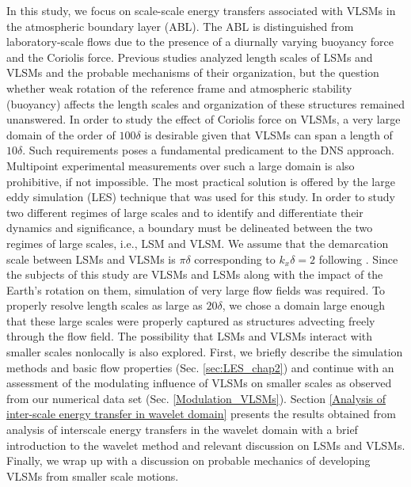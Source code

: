 In this study, we focus on scale-scale energy transfers associated with VLSMs in the atmospheric boundary layer (ABL). The ABL is distinguished from laboratory-scale flows due to the presence of a diurnally varying buoyancy  force and the Coriolis force. Previous studies analyzed length scales of LSMs and VLSMs and the probable mechanisms of their organization, but the question whether weak rotation of the reference frame and atmospheric stability (buoyancy) affects the length scales and organization of these structures remained unanswered. In order to study the effect of Coriolis force on VLSMs, a very large domain of the order of $100\delta$ is desirable given that VLSMs can span a length of $10\delta$. Such requirements poses a fundamental predicament to the DNS approach. Multipoint experimental measurements over such a large domain is also prohibitive, if not impossible. The most practical solution is offered by the large eddy simulation (LES) technique that was used for this study. In order to study two different regimes of large scales and to identify and differentiate their dynamics and significance, a boundary must be delineated between the two regimes of large scales, i.e., LSM and VLSM. We assume that the demarcation scale between LSMs and VLSMs is $\pi\delta$ corresponding to $k_x\delta = 2$ following \citet{guala_adrian_jfm2006}. Since the subjects of this study are VLSMs and LSMs along with the impact of the Earth's rotation on them, simulation of very large flow fields was required. To properly resolve length scales as large as $20\delta$,  we chose a domain large enough that these large scales were properly captured as structures advecting freely through the flow field. The possibility that LSMs and VLSMs  interact with smaller scales nonlocally is also explored.  First, we briefly describe the simulation methods and basic flow properties (Sec. \ref{sec:LES_chap2}) and continue with an assessment of the modulating influence of VLSMs on smaller scales as observed from our numerical data set (Sec. \ref{Modulation_VLSMs}).  Section \ref{Analysis of inter-scale energy transfer in wavelet domain} presents the results obtained from analysis of interscale energy transfers in the wavelet domain with a brief introduction to the wavelet method and relevant discussion on LSMs and VLSMs. Finally, we wrap up with a discussion on probable mechanics of developing VLSMs from smaller scale motions. 

